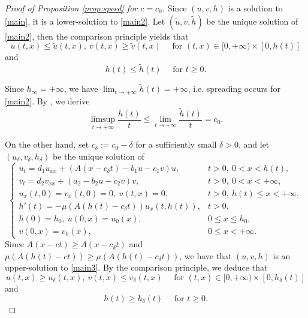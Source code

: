 \documentclass[reqno]{amsart}
\newcommand{\rev}[1]{#1}
\theoremstyle{plain}
\theoremstyle{definition}
\theoremstyle{remark}
\begin{document}
	\begin{proof}[Proof of Proposition \ref{prop:speed} for $c = c_0$]	
		Since $(u,v,h)$ is a solution to \eqref{main}, it is a lower-solution to \eqref{main2}.
		Let $(\tilde{u},\tilde{v},\tilde{h})$ be the unique solution of \eqref{main2}, then the comparison principle yields that
		\[
		u(t,x) \le \tilde{u}(t,x), ~ v(t,x) \ge \tilde{v}(t,x) \quad \text{ for } (t,x) \in [0,+\infty) \times [0,h(t)]
		\]
		and
		\[
		h(t) \le \tilde{h}(t) \quad \text{ for } t\ge0.
		\]
		
		Since $h_\infty=+\infty$, we have $\lim_{t\to+\infty} \tilde{h}(t) = +\infty$\rev{, i.e. spreading occurs for \eqref{main2}}. By \cite[Theorem 1.1]{MR3609207}, we derive
		\begin{equation}\label{upperbound}
			\limsup_{t\to+\infty} \frac{h(t)}{t} \le \lim_{t\to+\infty} \frac{\tilde{h}(t)}{t} = c_0.
		\end{equation}
		
		On the other hand, set $c_\delta := c_0 - \delta$ for a sufficiently small $\delta>0$, and let $(u_\delta,v_\delta,h_\delta)$ be the unique solution of		
		\begin{equation}\label{main3}
			\begin{cases}
				u_t = d_1u_{xx} + (A(x - c_\delta t) - b_1u - c_1 v) u, & t > 0,~ 0 < x < h(t), \\
				v_t = d_2v_{xx} + (a_2 - b_2u - c_2v)v,          & t > 0,~ 0 < x < +\infty, \\
				u_x(t, 0) = v_x(t, 0) = 0, ~ u(t, x) = 0,        & t > 0, ~ h(t) \leq x < +\infty, \\
				h'(t) = -\mu (A(h(t) - c_\delta t))u_x(t, h(t)),          & t > 0, \\
				h(0)=h_0,~ u(0, x) = u_0(x),                       & 0 \leq x \leq h_0, \\
				v(0, x) = v_0(x),                                  & 0 \le x < +\infty.
			\end{cases}
		\end{equation}
		Since $A(x-ct) \ge A(x-c_\delta t)$ and $\mu(A(h(t)-ct)) \ge \mu(A(h(t)-c_\delta t))$, we have that $(u,v,h)$ is an upper-solution to \eqref{main3}. By the comparison principle, we deduce that
		\[
		u(t,x) \ge u_\delta(t,x), ~ v(t,x) \le v_\delta(t,x) \quad \text{ for } (t,x) \in [0,+\infty) \times [0,h_\delta(t)]
		\]
		and
		\[
		h(t) \ge h_\delta(t) \quad\text{ for } t\ge0.
		\]
		

\end{proof}
\end{document}
